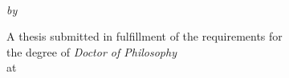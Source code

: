 \begin{titlepage}
  \vspace*{5cm}
  \makeatletter
  \begin{center}
    \begin{Huge}
      \@title
    \end{Huge} \\[0.3cm]
    \begin{Large}
      \emph{by} ~\\[0.3cm]
      \@author
    \end{Large}
    \vfill
    A thesis submitted in fulfillment of the requirements for ~\\
    the degree of \emph{Doctor of Philosophy} ~\\
    at ~\\
    \textsc{\@institute}
  \end{center}
  \makeatother
\end{titlepage}

\newpage
\null
\thispagestyle{empty}
\newpage

